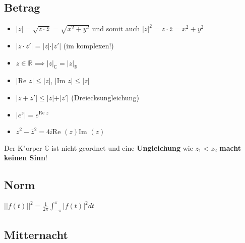 \subsection{Betrag}

\begin{itemize}[noitemsep,topsep=0pt]
	\item \(\vert z \vert = \sqrt{z \cdot \overline{z}} = \sqrt{x^2 + y^2}\) und somit auch \(\vert z \vert^2 = z\cdot \overline{z} = x^2+y^2\)
	\item $ \vert z \cdot z' \vert = \vert z \vert \cdot \vert z' \vert $ (im komplexen!)
	\item $ z \in \mathbb{R} \implies \vert z \vert_\mathbb{C} = \vert z \vert_\mathbb{R} $
	\item $ \vert \text{Re } z \vert \leqslant \vert z \vert $, $ \vert \text{Im } z \vert \leqslant \vert z \vert $
	\item $ \vert z + z' \vert \leqslant \vert z \vert + \vert z' \vert $ (Dreiecksungleichung)
	\item $ \vert e^z \vert = e^{\text{Re }z} $
	\item $ z^2 - \overline{z}^2 = 4i \text{Re }(z)\text{Im }(z) $
\end{itemize}


Der K"orper $\mathbb{C}$ ist nicht geordnet und eine \textbf{Ungleichung} wie $z_1<z_2$ \textbf{macht keinen Sinn}!


\subsection{Norm}
$\vert \vert f(t) \vert \vert^2 = \frac{1}{2\pi} \int_{-\pi}^{\pi} \vert f(t) \vert^2 dt$

\subsection{Mitternacht}

